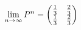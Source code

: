 \documentclass[preview]{standalone}
\begin{document}
\begin{align*}
\special{dvisvgm:raw <g id='unique000'>}\lim_{n\to\infty}P^n=\begin{pmatrix}\frac13&\frac23\\\frac13&\frac23\end{pmatrix}\special{dvisvgm:raw </g>}
\end{align*}
\end{document}
